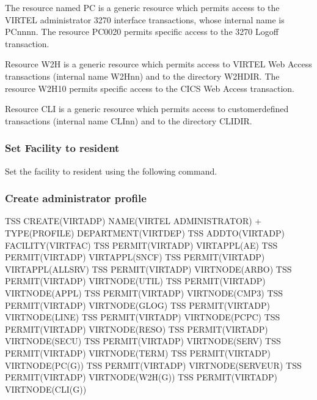 \documentclass[letterpaper,10pt,english]{sphinxmanual}
\begin{document}
\sphinxAtStartPar
The resource named PC is a generic resource which permits access to the VIRTEL administrator 3270 interface transactions, whose internal name is PC\sphinxhyphen{}nnnn. The resource PC\sphinxhyphen{}0020 permits specific access to the 3270 Logoff transaction.

\sphinxAtStartPar
Resource W2H is a generic resource which permits access to VIRTEL Web Access transactions (internal name W2H\sphinxhyphen{}nn) and to the directory W2H\sphinxhyphen{}DIR. The resource W2H\sphinxhyphen{}10 permits specific access to the CICS Web Access transaction.

\sphinxAtStartPar
Resource CLI is a generic resource which permits access to customer\sphinxhyphen{}defined transactions (internal name CLI\sphinxhyphen{}nn) and to the directory CLI\sphinxhyphen{}DIR.


\subsubsection{Set Facility to resident}
\label{\detokenize{Installation_Guide:set-facility-to-resident}}
\sphinxAtStartPar
Set the facility to resident using the following command.

\begin{sphinxVerbatim}[commandchars=\\\{\}]
  
\end{sphinxVerbatim}


\subsubsection{Create administrator profile}
\label{\detokenize{Installation_Guide:create-administrator-profile}}
\begin{sphinxVerbatim}[commandchars=\\\{\}]
TSS CREATE(VIRTADP) NAME(\PYGZsq{}VIRTEL ADMINISTRATOR\PYGZsq{}) +
        TYPE(PROFILE) DEPARTMENT(VIRTDEP)
TSS ADDTO(VIRTADP) FACILITY(VIRTFAC)
TSS PERMIT(VIRTADP) VIRTAPPL(AE)
TSS PERMIT(VIRTADP) VIRTAPPL(SNCF)
TSS PERMIT(VIRTADP) VIRTAPPL(\PYGZdl{}\PYGZdl{}ALLSRV)
TSS PERMIT(VIRTADP) VIRTNODE(\PYGZdl{}\PYGZdl{}ARBO\PYGZdl{}\PYGZdl{})
TSS PERMIT(VIRTADP) VIRTNODE(\PYGZdl{}\PYGZdl{}UTIL\PYGZdl{}\PYGZdl{})
TSS PERMIT(VIRTADP) VIRTNODE(\PYGZdl{}\PYGZdl{}APPL\PYGZdl{}\PYGZdl{})
TSS PERMIT(VIRTADP) VIRTNODE(\PYGZdl{}\PYGZdl{}CMP3\PYGZdl{}\PYGZdl{})
TSS PERMIT(VIRTADP) VIRTNODE(\PYGZdl{}\PYGZdl{}GLOG\PYGZdl{}\PYGZdl{})
TSS PERMIT(VIRTADP) VIRTNODE(\PYGZdl{}\PYGZdl{}LINE\PYGZdl{}\PYGZdl{})
TSS PERMIT(VIRTADP) VIRTNODE(\PYGZdl{}\PYGZdl{}PCPC\PYGZdl{}\PYGZdl{})
TSS PERMIT(VIRTADP) VIRTNODE(\PYGZdl{}\PYGZdl{}RESO\PYGZdl{}\PYGZdl{})
TSS PERMIT(VIRTADP) VIRTNODE(\PYGZdl{}\PYGZdl{}SECU\PYGZdl{}\PYGZdl{})
TSS PERMIT(VIRTADP) VIRTNODE(\PYGZdl{}\PYGZdl{}SERV\PYGZdl{}\PYGZdl{})
TSS PERMIT(VIRTADP) VIRTNODE(\PYGZdl{}\PYGZdl{}TERM\PYGZdl{}\PYGZdl{})
TSS PERMIT(VIRTADP) VIRTNODE(PC(G))
TSS PERMIT(VIRTADP) VIRTNODE(SERVEUR)
TSS PERMIT(VIRTADP) VIRTNODE(W2H(G))
TSS PERMIT(VIRTADP) VIRTNODE(CLI(G))
\end{sphinxVerbatim}
\end{document}
